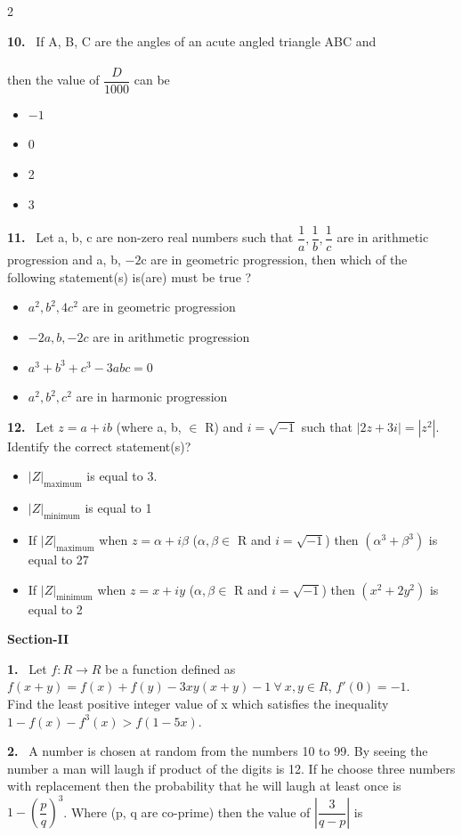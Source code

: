 \documentclass[10pt]{extarticle}
\newcommand{\sect}[1]{\par\smallskip\noindent\textbf{#1}\par}
\newcommand{\qn}[1]{\par\smallskip\noindent\textbf{#1.}~}
\newenvironment{qoptions}{\begin{itemize}[leftmargin=1.8em,itemsep=1pt,topsep=2pt,label={}]}{\end{itemize}}
\newcommand{\opt}[2]{\item[(#1)] #2}
\begin{document}
\begin{multicols}{2}
\qn{10} If A, B, C are the angles of an acute angled triangle ABC and\\
\\
then the value of $\dfrac D{1000}$ can be
\begin{qoptions}
\opt{A}{$-1$}
\opt{B}{0}
\opt{C}{2}
\opt{D}{3}
\end{qoptions}

\qn{11} Let a, b, c are non-zero real numbers such that $\dfrac1a,\dfrac1b,\dfrac1c$ are in arithmetic progression and a, b, $-2$c are in geometric progression, then which of the following statement(s) is(are) must be true ?
\begin{qoptions}
\opt{A}{$a^2,b^2,4c^2$ are in geometric progression}
\opt{B}{$-2a,b,-2c$ are in arithmetic progression}
\opt{C}{$a^3+b^3+c^3-3abc=0$}
\opt{D}{$a^2,b^2,c^2$ are in harmonic progression}
\end{qoptions}

\qn{12} Let $z=a+ib$ (where a, b, $\in$ R) and $i=\sqrt{-1}$ such that $|2z+3i|=|z^2|$. Identify the correct statement(s)?
\begin{qoptions}
\opt{A}{$|Z|_{\text{maximum}}$ is equal to 3.}
\opt{B}{$|Z|_{\text{minimum}}$ is equal to 1}
\opt{C}{If $|Z|_{\text{maximum}}$ when $z=\alpha+i\beta$ ($\alpha,\beta\in$ R and $i=\sqrt{-1}$) then $(\alpha^3+\beta^3)$ is equal to 27}
\opt{D}{If $|Z|_{\text{minimum}}$ when $z=x+iy$ ($\alpha,\beta\in$ R and $i=\sqrt{-1}$) then $(x^2+2y^2)$ is equal to 2}
\end{qoptions}

\sect{Section-II}

\qn{1} Let $f:R\to R$ be a function defined as\\
$f(x+y)=f(x)+f(y)-3xy(x+y)-1\ \forall\ x,y\in R$, $f'(0)=-1$.\\
Find the least positive integer value of x which satisfies the inequality\\
$1-f(x)-f^3(x)>f(1-5x)$.

\qn{2} A number is chosen at random from the numbers 10 to 99. By seeing the number a man will laugh if product of the digits is 12. If he choose three numbers with replacement then the probability that he will laugh at least once is $1-\left(\dfrac pq\right)^3$. Where (p, q are co-prime) then the value of $\left|\dfrac3{q-p}\right|$ is


\end{multicols}
\end{document}
